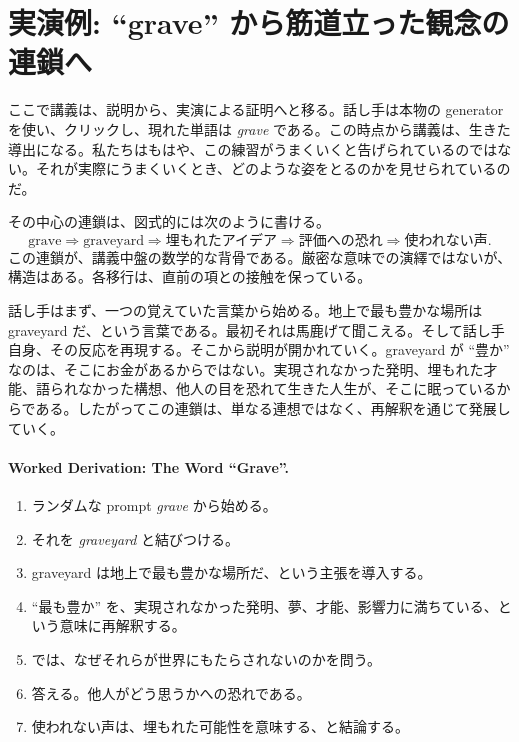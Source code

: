 \section{実演例: ``grave'' から筋道立った観念の連鎖へ}

ここで講義は、説明から、実演による証明へと移る。話し手は本物の generator を使い、クリックし、現れた単語は \emph{grave} である。この時点から講義は、生きた導出になる。私たちはもはや、この練習がうまくいくと告げられているのではない。それが実際にうまくいくとき、どのような姿をとるのかを見せられているのだ。

その中心の連鎖は、図式的には次のように書ける。
\begin{equation}
\text{grave} \Longrightarrow \text{graveyard} \Longrightarrow \text{埋もれたアイデア} \Longrightarrow \text{評価への恐れ} \Longrightarrow \text{使われない声}.
\end{equation}
この連鎖が、講義中盤の数学的な背骨である。厳密な意味での演繹ではないが、構造はある。各移行は、直前の項との接触を保っている。

話し手はまず、一つの覚えていた言葉から始める。地上で最も豊かな場所は graveyard だ、という言葉である。最初それは馬鹿げて聞こえる。そして話し手自身、その反応を再現する。そこから説明が開かれていく。graveyard が ``豊か'' なのは、そこにお金があるからではない。実現されなかった発明、埋もれた才能、語られなかった構想、他人の目を恐れて生きた人生が、そこに眠っているからである。したがってこの連鎖は、単なる連想ではなく、再解釈を通じて発展していく。

\paragraph{Worked Derivation: The Word ``Grave''.}
\begin{enumerate}
\item ランダムな prompt \emph{grave} から始める。
\item それを \emph{graveyard} と結びつける。
\item graveyard は地上で最も豊かな場所だ、という主張を導入する。
\item ``最も豊か'' を、実現されなかった発明、夢、才能、影響力に満ちている、という意味に再解釈する。
\item では、なぜそれらが世界にもたらされないのかを問う。
\item 答える。他人がどう思うかへの恐れである。
\item 使われない声は、埋もれた可能性を意味する、と結論する。
\end{enumerate}

